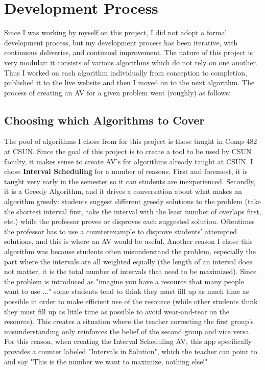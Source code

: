 \chapter{Development Process}
Since I was working by myself on this project, I did not adopt 
a formal development process, 
but my development process has been iterative, with continuous deliveries, 
and continued improvement. The nature of this project is very modular:
it consists of various algorithms which do not rely on one another.
Thus I worked on each algorithm individually 
from conception to completion, published it to the live website 
and then I moved on to the next algorithm. 
The process of creating an AV for a given problem went (roughly) as follows:
\section{Choosing which Algorithms to Cover}

The pool of algorithms I chose from for this project
is those taught in Comp 482 at CSUN. 
Since the goal of this project is to create a tool to be used by CSUN faculty,
it makes sense to create AV's for algorithms already taught at CSUN. 
\newline\newline
\newline\newline
I chose \textbf{Interval Scheduling} for a number of reasons. 
First and foremost, it is taught very early in the semester so 
it can students are inexperienced.
Secondly, it is a Greedy Algorithm, and it drives a conversation
about what makes an algorithm greedy:
students suggest different greedy solutions to the problem 
(take the shortest interval first,
take the interval with the least number of overlaps first, etc.)
while the professor proves or disproves each suggested solution. 
Oftentimes the professor has to use a counterexample to disprove 
students' attempted solutions, and this is where an AV would be useful.
\newline\newline
Another reason I chose this algorithm was because students often 
misunderstand the problem, especially the part where the intervals 
are all weighted equally (the length of an interval does not matter, 
it is the total number of intervals that need to be maximized).
Since the problem is introduced as 
"imagine you have a resource that many people want to use ..."
some students tend to think they must fill up as much time as possible 
in order to make efficient use of the resource
(while other students think they must fill up as little time as possible
to avoid wear-and-tear on the resource). 
This creates a situation where the teacher correcting the first group's
misunderstanding only reinforces the belief of the second group and vice versa.
For this reason, when creating the Interval Scheduling AV, this app
specifically provides a counter labeled "Intervals in Solution", which 
the teacher can point to and say "This is the number we want to maximize, nothing else!"
\newline\newline

